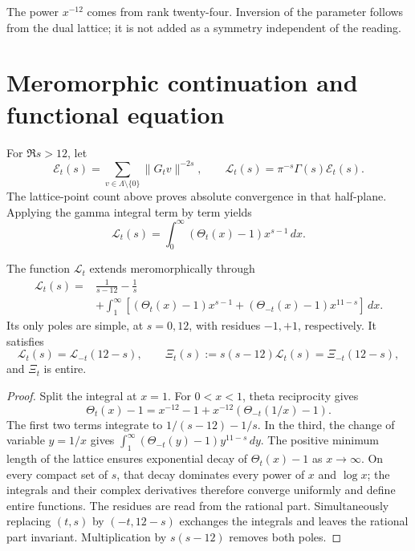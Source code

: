 The power \(x^{-12}\) comes from rank twenty-four. Inversion of the parameter follows from the dual lattice; it is not added as a symmetry independent of the reading.

\section{Meromorphic continuation and functional equation}

For \(\Re s>12\), let
\begin{equation}
 \mathcal E_t(s)=\sum_{v\in\Lambda\setminus\{0\}}\|G_tv\|^{-2s},
 \qquad \mathcal L_t(s)=\pi^{-s}\Gamma(s)\mathcal E_t(s).
 \label{x_reciprocidad:rec:eq:epstein}
\end{equation}
The lattice-point count above proves absolute convergence in that half-plane. Applying the gamma integral term by term yields
\[
 \mathcal L_t(s)=\int_0^\infty(\Theta_t(x)-1)x^{s-1}\,dx.
\]

\begin{theorem}
\label{x_reciprocidad:rec:thm:mellin}
The function \(\mathcal L_t\) extends meromorphically through
\begin{align}
 \mathcal L_t(s)={}&\frac1{s-12}-\frac1s\nonumber\\
 &+\int_1^\infty\left[(\Theta_t(x)-1)x^{s-1}
                 +(\Theta_{-t}(x)-1)x^{11-s}\right]\,dx.
 \label{x_reciprocidad:rec:eq:mellin-partida}
\end{align}
Its only poles are simple, at \(s=0,12\), with residues \(-1,+1\), respectively. It satisfies
\begin{equation}
 \mathcal L_t(s)=\mathcal L_{-t}(12-s),\qquad
 \Xi_t(s):=s(s-12)\mathcal L_t(s)=\Xi_{-t}(12-s),
 \label{x_reciprocidad:rec:eq:funcional}
\end{equation}
and \(\Xi_t\) is entire.
\end{theorem}
\begin{proof}
Split the integral at \(x=1\). For \(0<x<1\), theta reciprocity gives
\[
 \Theta_t(x)-1=x^{-12}-1+x^{-12}(\Theta_{-t}(1/x)-1).
\]
The first two terms integrate to \(1/(s-12)-1/s\). In the third, the change of variable \(y=1/x\) gives
\(\int_1^\infty(\Theta_{-t}(y)-1)y^{11-s}\,dy\).
The positive minimum length of the lattice ensures exponential decay of \(\Theta_t(x)-1\) as \(x\to\infty\). On every compact set of \(s\), that decay dominates every power of \(x\) and \(\log x\); the integrals and their complex derivatives therefore converge uniformly and define entire functions. The residues are read from the rational part. Simultaneously replacing \((t,s)\) by \((-t,12-s)\) exchanges the integrals and leaves the rational part invariant. Multiplication by \(s(s-12)\) removes both poles.
\end{proof}

